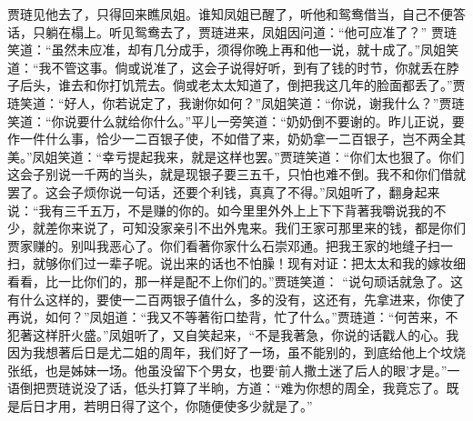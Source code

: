 \begin{parag}


    贾琏见他去了，只得回来瞧凤姐。谁知凤姐已醒了，听他和鸳鸯借当，自己不便答话，只躺在榻上。听见鸳鸯去了，贾琏进来，凤姐因问道：“他可应准了？” 贾琏笑道：“虽然未应准，却有几分成手，须得你晚上再和他一说，就十成了。”凤姐笑道：“我不管这事。倘或说准了，这会子说得好听，到有了钱的时节，你就丢在脖子后头，谁去和你打饥荒去。倘或老太太知道了，倒把我这几年的脸面都丢了。”贾琏笑道：“好人，你若说定了，我谢你如何？”凤姐笑道：“你说，谢我什么？”贾琏笑道：“你说要什么就给你什么。”平儿一旁笑道：“奶奶倒不要谢的。昨儿正说，要作一件什么事，恰少一二百银子使，不如借了来，奶奶拿一二百银子，岂不两全其美。”凤姐笑道：“幸亏提起我来，就是这样也罢。”贾琏笑道：“你们太也狠了。你们这会子别说一千两的当头，就是现银子要三五千，只怕也难不倒。我不和你们借就罢了。这会子烦你说一句话，还要个利钱，真真了不得。”凤姐听了，翻身起来说：“我有三千五万，不是赚的你的。如今里里外外上上下下背著我嚼说我的不少，就差你来说了，可知没家亲引不出外鬼来。我们王家可那里来的钱，都是你们贾家赚的。别叫我恶心了。你们看著你家什么石崇邓通。把我王家的地缝子扫一扫，就够你们过一辈子呢。说出来的话也不怕臊！现有对证：把太太和我的嫁妆细看看，比一比你们的，那一样是配不上你们的。”贾琏笑道： “说句顽话就急了。这有什么这样的，要使一二百两银子值什么，多的没有，这还有，先拿进来，你使了再说，如何？”凤姐道：“我又不等著衔口垫背，忙了什么。”贾琏道：“何苦来，不犯著这样肝火盛。”凤姐听了，又自笑起来，“不是我著急，你说的话戳人的心。我因为我想著后日是尤二姐的周年，我们好了一场，虽不能别的，到底给他上个坟烧张纸，也是姊妹一场。他虽没留下个男女，也要‘前人撒土迷了后人的眼’才是。”一语倒把贾琏说没了话，低头打算了半晌，方道：“难为你想的周全，我竟忘了。既是后日才用，若明日得了这个，你随便使多少就是了。”
\end{parag}



